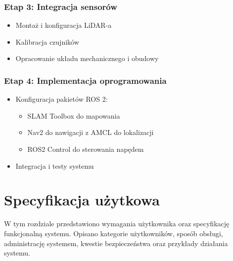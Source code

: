 \documentclass[a4paper,twoside,12pt]{book}
\begin{document}
\subsection{Etap 3: Integracja sensorów}
\begin{itemize}
\item Montaż i konfiguracja LiDAR-a
\item Kalibracja czujników
\item Opracowanie układu mechanicznego i obudowy
\end{itemize}

\subsection{Etap 4: Implementacja oprogramowania}
\begin{itemize}
\item Konfiguracja pakietów ROS 2:
	\begin{itemize}
	\item SLAM Toolbox do mapowania
	\item Nav2 do nawigacji z AMCL do lokalizacji
	\item ROS2 Control do sterowania napędem
	\end{itemize}
\item Integracja i testy systemu
\end{itemize}



\chapter{Specyfikacja użytkowa}
\label{ch:04}
W tym rozdziale przedstawiono wymagania użytkownika oraz specyfikację funkcjonalną systemu. Opisano kategorie użytkowników, sposób obsługi, administrację systemem, kwestie bezpieczeństwa oraz przykłady działania systemu.
\end{document}
